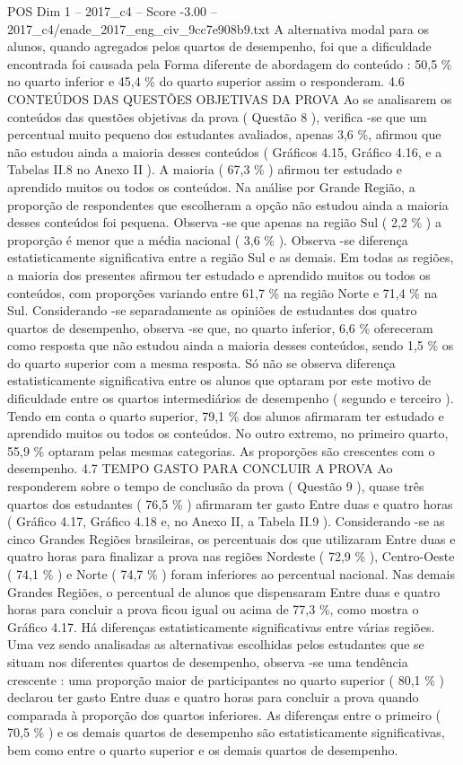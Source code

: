 \begin{textsample}{POS Dim 1 – 2017\_c4 – Score -3.00 – 2017\_c4/enade\_2017\_eng\_civ\_9cc7e908b9.txt}
A alternativa modal para os alunos, quando agregados pelos quartos de desempenho, foi que a dificuldade encontrada foi causada pela Forma diferente de abordagem do conteúdo : 50,5 \% no quarto inferior e 45,4 \% do quarto superior assim o responderam. 4.6 CONTEÚDOS DAS QUESTÕES OBJETIVAS DA PROVA Ao se analisarem os conteúdos das questões objetivas da prova ( Questão 8 ), verifica -se que um percentual muito pequeno dos estudantes avaliados, apenas 3,6 \%, afirmou que não estudou ainda a maioria desses conteúdos ( Gráficos 4.15, Gráfico 4.16, e a Tabelas II.8 no Anexo II ).
A maioria ( 67,3 \% ) afirmou ter estudado e aprendido muitos ou todos os conteúdos.
Na análise por Grande Região, a proporção de respondentes que escolheram a opção não estudou ainda a maioria desses conteúdos foi pequena.
Observa -se que apenas na região Sul ( 2,2 \% ) a proporção é menor que a média nacional ( 3,6 \% ).
Observa -se diferença estatisticamente significativa entre a região Sul e as demais.
Em todas as regiões, a maioria dos presentes afirmou ter estudado e aprendido muitos ou todos os conteúdos, com proporções variando entre 61,7 \% na região Norte e 71,4 \% na Sul.
Considerando -se separadamente as opiniões de estudantes dos quatro quartos de desempenho, observa -se que, no quarto inferior, 6,6 \% ofereceram como resposta que não estudou ainda a maioria desses conteúdos, sendo 1,5 \% os do quarto superior com a mesma resposta.
Só não se observa diferença estatisticamente significativa entre os alunos que optaram por este motivo de dificuldade entre os quartos intermediários de desempenho ( segundo e terceiro ).
Tendo em conta o quarto superior, 79,1 \% dos alunos afirmaram ter estudado e aprendido muitos ou todos os conteúdos.
No outro extremo, no primeiro quarto, 55,9 \% optaram pelas mesmas categorias.
As proporções são crescentes com o desempenho. 4.7 TEMPO GASTO PARA CONCLUIR A PROVA Ao responderem sobre o tempo de conclusão da prova ( Questão 9 ), quase três quartos dos estudantes ( 76,5 \% ) afirmaram ter gasto Entre duas e quatro horas ( Gráfico 4.17, Gráfico 4.18 e, no Anexo II, a Tabela II.9 ).
Considerando -se as cinco Grandes Regiões brasileiras, os percentuais dos que utilizaram Entre duas e quatro horas para finalizar a prova nas regiões Nordeste ( 72,9 \% ), Centro-Oeste ( 74,1 \% ) e Norte ( 74,7 \% ) foram inferiores ao percentual nacional.
Nas demais Grandes Regiões, o percentual de alunos que dispensaram Entre duas e quatro horas para concluir a prova ficou igual ou acima de 77,3 \%, como mostra o Gráfico 4.17.
Há diferenças estatisticamente significativas entre várias regiões.
Uma vez sendo analisadas as alternativas escolhidas pelos estudantes que se situam nos diferentes quartos de desempenho, observa -se uma tendência crescente : uma proporção maior de participantes no quarto superior ( 80,1 \% ) declarou ter gasto Entre duas e quatro horas para concluir a prova quando comparada à proporção dos quartos inferiores.
As diferenças entre o primeiro ( 70,5 \% ) e os demais quartos de desempenho são estatisticamente significativas, bem como entre o quarto superior e os demais quartos de desempenho.

\end{textsample}
